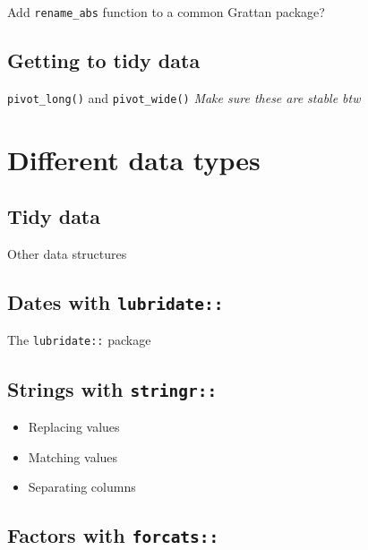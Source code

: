 \documentclass[]{book}
\providecommand{\tightlist}{%
  \setlength{\itemsep}{0pt}\setlength{\parskip}{0pt}}
\begin{document}
Add \texttt{rename\_abs} function to a common Grattan package?

\hypertarget{getting-to-tidy-data}{%
\section{Getting to tidy data}\label{getting-to-tidy-data}}

\texttt{pivot\_long()} and \texttt{pivot\_wide()}
\emph{Make sure these are stable btw}

\hypertarget{different-data-types}{%
\chapter{Different data types}\label{different-data-types}}

\hypertarget{tidy-data}{%
\section{Tidy data}\label{tidy-data}}

Other data structures

\hypertarget{dates-with-lubridate}{%
\section{\texorpdfstring{Dates with \texttt{lubridate::}}{Dates with lubridate::}}\label{dates-with-lubridate}}

The \texttt{lubridate::} package

\hypertarget{strings-with-stringr}{%
\section{\texorpdfstring{Strings with \texttt{stringr::}}{Strings with stringr::}}\label{strings-with-stringr}}

\begin{itemize}
\tightlist
\item
  Replacing values
\item
  Matching values
\item
  Separating columns
\end{itemize}

\hypertarget{factors-with-forcats}{%
\section{\texorpdfstring{Factors with \texttt{forcats::}}{Factors with forcats::}}\label{factors-with-forcats}}
\end{document}
